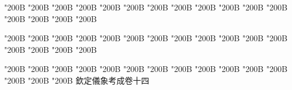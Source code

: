 \begin{正文}
\char"200B\relax{}
\char"200B\relax{}
\char"200B\relax{}
\char"200B\relax{}
\char"200B\relax{}
\char"200B\relax{}
\char"200B\relax{}
\char"200B\relax{}
\char"200B\relax{}
\char"200B\relax{}
\char"200B\relax{}
\char"200B\relax{}
\char"200B\relax{}
\char"200B\relax{}
\char"200B\relax{}
\char"200B\relax
{}\par
\end{正文}\clearpage
{}
\begin{正文}
\char"200B\relax{}
\char"200B\relax{}
\char"200B\relax{}
\char"200B\relax{}
\char"200B\relax{}
\char"200B\relax{}
\char"200B\relax{}
\char"200B\relax{}
\char"200B\relax{}
\char"200B\relax{}
\char"200B\relax{}
\char"200B\relax{}
\char"200B\relax{}
\char"200B\relax{}
\char"200B\relax{}
\char"200B\relax
{}\par
\end{正文}\clearpage
{}
\begin{正文}
\char"200B\relax{}
\char"200B\relax{}
\char"200B\relax{}
\char"200B\relax{}
\char"200B\relax{}
\char"200B\relax{}
\char"200B\relax{}
\char"200B\relax{}
\char"200B\relax{}
\char"200B\relax{}
\char"200B\relax{}
\char"200B\relax{}
\char"200B\relax{}
\char"200B\relax{}
\char"200B\relax{}
欽定儀象考成卷十四
\par

\par\end{正文}\clearpage
